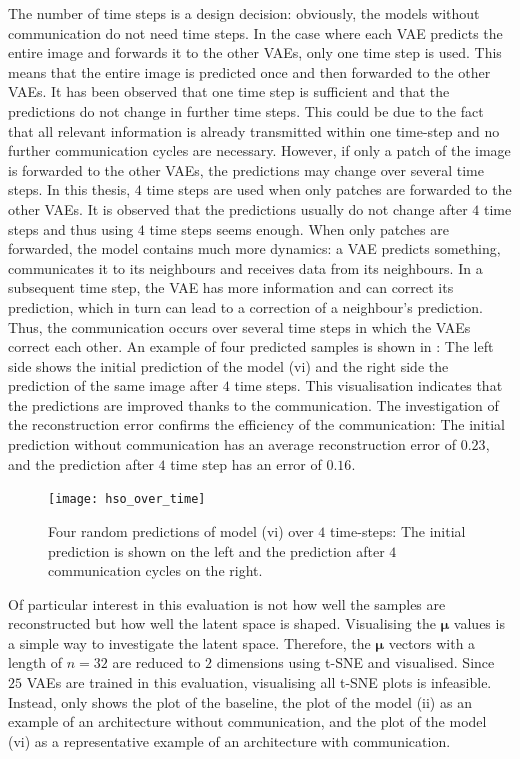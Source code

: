 The number of time steps is a design decision: obviously, the models without communication do not need time steps. In the case where each VAE predicts the entire image and forwards it to the other VAEs, only one time step is used. This means that the entire image is predicted once and then forwarded to the other VAEs. It has been observed that one time step is sufficient and that the predictions do not change in further time steps. This could be due to the fact that all relevant information is already transmitted within one time-step and no further communication cycles are necessary. However, if only a patch of the image is forwarded to the other VAEs, the predictions may change over several time steps. In this thesis, $4$ time steps are used when only patches are forwarded to the other VAEs. It is observed that the predictions usually do not change after $4$ time steps and thus using $4$ time steps seems enough. When only patches are forwarded, the model contains much more dynamics: a VAE predicts something, communicates it to its neighbours and receives data from its neighbours. In a subsequent time step, the VAE has more information and can correct its prediction, which in turn can lead to a correction of a neighbour's prediction. Thus, the communication occurs over several time steps in which the VAEs correct each other. An example of four predicted samples is shown in : The left side shows the initial prediction of the model (vi) and the right side the prediction of the same image after $4$ time steps. This visualisation indicates that the predictions are improved thanks to the communication. The investigation of the reconstruction error confirms the efficiency of the communication: The initial prediction without communication has an average reconstruction error of $0.23$, and the prediction after $4$ time step has an error of $0.16$.

\begin{figure}[h]
    \centering
    \texttt{[image: hso\_over\_time]}
    \caption[Change of the model's prediction over time]{Four random predictions of model (vi) over $4$ time-steps: The initial prediction is shown on the left and the prediction after $4$ communication cycles on the right.}
\end{figure}

Of particular interest in this evaluation is not how well the samples are reconstructed but how well the latent space is shaped. Visualising the $\boldsymbol{\mu}$ values is a simple way to investigate the latent space. Therefore, the $\boldsymbol{\mu}$ vectors with a length of $n=32$ are reduced to $2$ dimensions using t-SNE  and visualised. Since $25$ VAEs are trained in this evaluation, visualising all t-SNE plots is infeasible. Instead,  only shows the plot of the baseline, the plot of the model (ii) as an example of an architecture without communication, and the plot of the model (vi) as a representative example of an architecture with communication. 

